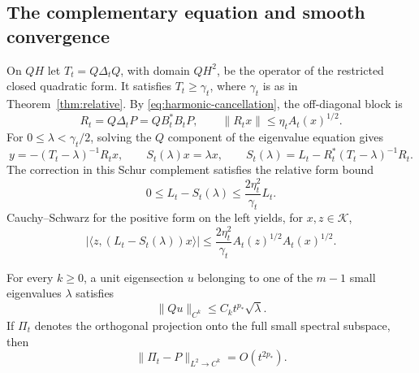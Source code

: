 \subsection{The complementary equation and smooth convergence}

On $QH$ let $T_t=Q\Delta_tQ$, with domain $QH^2$, be the operator of
the restricted closed quadratic form. It satisfies $T_t\ge \gamma_t$, where
$\gamma_t$ is as in Theorem~\ref{thm:relative}. By \eqref{eq:harmonic-cancellation}, the
off-diagonal block is
\begin{equation}\label{eq:off-diagonal}
 R_t=Q\Delta_tP=QB_t^*B_tP,
 \qquad \lVert R_tx\rVert\le\eta_t A_t(x)^{1/2}.
\end{equation}
For $0\le\lambda<\gamma_t/2$, solving the $Q$ component of the eigenvalue
equation gives
\begin{equation}\label{eq:schur}
 y=-(T_t-\lambda)^{-1}R_tx,\qquad
 S_t(\lambda)x=\lambda x,\qquad
 S_t(\lambda)=L_t-R_t^*(T_t-\lambda)^{-1}R_t.
\end{equation}
The correction in this Schur complement satisfies the relative form bound
\begin{equation}\label{eq:schur-bound}
 0\le L_t-S_t(\lambda)\le\frac{2\eta_t^2}{\gamma_t}L_t.
\end{equation}
Cauchy--Schwarz for the positive form on the left yields, for $x,z\in
\mathcal K$,
\begin{equation}\label{eq:polarized-schur}
 |\langle z,(L_t-S_t(\lambda))x\rangle|
 \le\frac{2\eta_t^2}{\gamma_t}A_t(z)^{1/2}A_t(x)^{1/2}.
\end{equation}

\begin{proposition}\label{prop:subspace}
For every $k\ge0$, a unit eigensection $u$ belonging to one of the
$m-1$ small eigenvalues $\lambda$ satisfies
\begin{equation}\label{eq:smooth-complement}
 \lVert Qu\rVert_{C^k}\le C_k t^{p_*}\sqrt\lambda.
\end{equation}
If $\Pi_t$ denotes the orthogonal projection onto the full small
spectral subspace, then
\begin{equation}\label{eq:full-projection}
 \lVert\Pi_t-P\rVert_{L^2\to C^k}=O(t^{2p_*}).
\end{equation}
\end{proposition}

